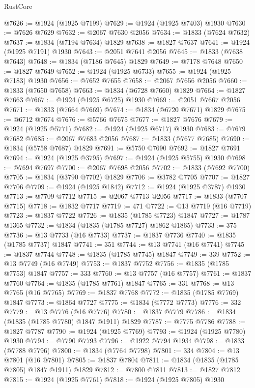 \begin{lexlean}{RustCore}
\begin{coremodule}
@7626 := @1924 (@1925 @7199)
@7629 := @1924 (@1925 @7403) @1930
@7630 := @7626 @7629
@7632 := @2067 @7630 @2056
@7634 := @1833 (@7624 @7632)
@7637 := @1834 (@7194 @7634) @1829
@7638 := @1827 @7637
@7641 := @1924 (@1925 @7191) @1930
@7643 := @2051 @7641 @2056
@7645 := @1833 (@7638 @7643)
@7648 := @1834 (@7186 @7645) @1829
@7649 := @7178 @7648
@7650 := @1827 @7649
@7652 := @1924 (@1925 @6733)
@7655 := @1924 (@1925 @7183) @1930
@7656 := @7652 @7655
@7658 := @2067 @7656 @2056
@7660 := @1833 (@7650 @7658)
@7663 := @1834 (@6728 @7660) @1829
@7664 := @1827 @7663
@7667 := @1924 (@1925 @6725) @1930
@7669 := @2051 @7667 @2056
@7671 := @1833 (@7664 @7669)
@7674 := @1834 (@6720 @7671) @1829
@7675 := @6712 @7674
@7676 := @5766 @7675
@7677 := @1827 @7676
@7679 := @1924 (@1925 @5771)
@7682 := @1924 (@1925 @6717) @1930
@7683 := @7679 @7682
@7685 := @2067 @7683 @2056
@7687 := @1833 (@7677 @7685)
@7690 := @1834 (@5758 @7687) @1829
@7691 := @5750 @7690
@7692 := @1827 @7691
@7694 := @1924 (@1925 @3795)
@7697 := @1924 (@1925 @5755) @1930
@7698 := @7694 @7697
@7700 := @2067 @7698 @2056
@7702 := @1833 (@7692 @7700)
@7705 := @1834 (@3790 @7702) @1829
@7706 := @3782 @7705
@7707 := @1827 @7706
@7709 := @1924 (@1925 @1842)
@7712 := @1924 (@1925 @3787) @1930
@7713 := @7709 @7712
@7715 := @2067 @7713 @2056
@7717 := @1833 (@7707 @7715)
@7718 := @1832 @7717
@7719 := 471
@7722 := @13 @7719 (@16 @7719)
@7723 := @1837 @7722
@7726 := @1835 (@1785 @7723) @1847
@7727 := @1787 @1365
@7732 := @1834 (@1835 (@1785 @7727) @1862 @1865)
@7733 := 375
@7736 := @13 @7733 (@16 @7733)
@7737 := @1837 @7736
@7740 := @1835 (@1785 @7737) @1847
@7741 := 351
@7744 := @13 @7741 (@16 @7741)
@7745 := @1837 @7744
@7748 := @1835 (@1785 @7745) @1847
@7749 := 339
@7752 := @13 @7749 (@16 @7749)
@7753 := @1837 @7752
@7756 := @1835 (@1785 @7753) @1847
@7757 := 333
@7760 := @13 @7757 (@16 @7757)
@7761 := @1837 @7760
@7764 := @1835 (@1785 @7761) @1847
@7765 := 331
@7768 := @13 @7765 (@16 @7765)
@7769 := @1837 @7768
@7772 := @1835 (@1785 @7769) @1847
@7773 := @1864 @7727
@7775 := @1834 (@7772 @7773)
@7776 := 332
@7779 := @13 @7776 (@16 @7776)
@7780 := @1837 @7779
@7786 := @1834 (@1835 (@1785 @7780) @1847 @1911) @1829
@7787 := @7775 @7786
@7788 := @1827 @7787
@7790 := @1924 (@1925 @7769)
@7793 := @1924 (@1925 @7780) @1930
@7794 := @7790 @7793
@7796 := @1922 @7794 @1934
@7798 := @1833 (@7788 @7796)
@7800 := @1834 (@7764 @7798)
@7801 := 334
@7804 := @13 @7801 (@16 @7801)
@7805 := @1837 @7804
@7811 := @1834 (@1835 (@1785 @7805) @1847 @1911) @1829
@7812 := @7800 @7811
@7813 := @1827 @7812
@7815 := @1924 (@1925 @7761)
@7818 := @1924 (@1925 @7805) @1930

\end{coremodule}
\end{lexlean}
